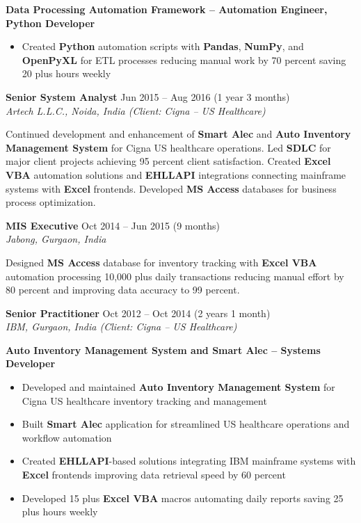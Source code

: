 \documentclass[10pt,a4paper]{article}
\newcommand{\jobentry}[3]{%
    \vspace{4pt}
    {\normalsize\bfseries #1} \hfill #2\\
    \textit{#3}
}
\begin{document}
\textbf{Data Processing Automation Framework -- Automation Engineer, Python Developer}
\begin{itemize}
    \item Created \textbf{Python} automation scripts with \textbf{Pandas}, \textbf{NumPy}, and \textbf{OpenPyXL} for ETL processes reducing manual work by 70 percent saving 20 plus hours weekly
\end{itemize}

\jobentry{Senior System Analyst}{Jun 2015 -- Aug 2016 (1 year 3 months)}{Artech L.L.C., Noida, India (Client: Cigna -- US Healthcare)}

Continued development and enhancement of \textbf{Smart Alec} and \textbf{Auto Inventory Management System} for Cigna US healthcare operations. Led \textbf{SDLC} for major client projects achieving 95 percent client satisfaction. Created \textbf{Excel VBA} automation solutions and \textbf{EHLLAPI} integrations connecting mainframe systems with \textbf{Excel} frontends. Developed \textbf{MS Access} databases for business process optimization.

\jobentry{MIS Executive}{Oct 2014 -- Jun 2015 (9 months)}{Jabong, Gurgaon, India}

Designed \textbf{MS Access} database for inventory tracking with \textbf{Excel VBA} automation processing 10,000 plus daily transactions reducing manual effort by 80 percent and improving data accuracy to 99 percent.

\jobentry{Senior Practitioner}{Oct 2012 -- Oct 2014 (2 years 1 month)}{IBM, Gurgaon, India (Client: Cigna -- US Healthcare)}

\textbf{Auto Inventory Management System and Smart Alec -- Systems Developer}
\begin{itemize}
    \item Developed and maintained \textbf{Auto Inventory Management System} for Cigna US healthcare inventory tracking and management
    \item Built \textbf{Smart Alec} application for streamlined US healthcare operations and workflow automation
    \item Created \textbf{EHLLAPI}-based solutions integrating IBM mainframe systems with \textbf{Excel} frontends improving data retrieval speed by 60 percent
    \item Developed 15 plus \textbf{Excel VBA} macros automating daily reports saving 25 plus hours weekly
\end{itemize}

\end{document}
